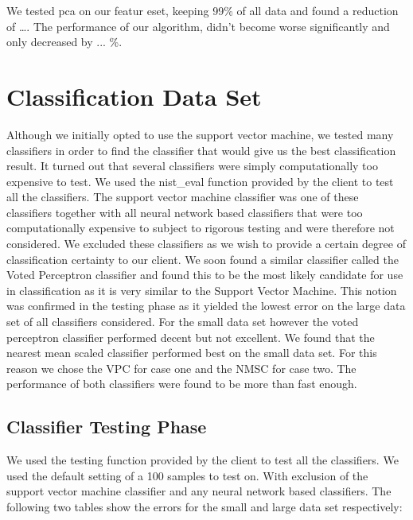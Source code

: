 \documentclass[%
        compressed,
        final,
        notitlepage,
        narroweqnarray,
        inline,
        twoside,
        ]{ieee}
\begin{document}
We tested pca on our featur eset, keeping 99\% of all data and found a reduction
of …. The performance of our algorithm, didn't become worse significantly and
only decreased by ... \%.

\section{Classification Data Set}
Although we initially opted to use the support vector machine, we tested many
classifiers in order to find the classifier that would give us the best
classification result. It turned out that several classifiers were simply
computationally too expensive to test. We used the nist\_eval function provided
by the client to test all the classifiers. The support vector machine classifier
was one of these classifiers together with all neural network based classifiers
that were too computationally expensive to subject to rigorous testing and were
therefore not considered. We excluded these classifiers as we wish to provide a
certain degree of classification certainty to our client. We soon found a
similar classifier called the Voted Perceptron classifier and found this to be
the most likely candidate for use in classification as it is very similar to the
Support Vector Machine. This notion was confirmed in the testing phase as it
yielded the lowest error on the large data set of all classifiers considered.
For the small data set however the voted perceptron classifier performed decent
but not excellent. We found that the nearest mean scaled classifier performed
best on the small data set. For this reason we chose the VPC for case one and
the NMSC for case two. The performance of both classifiers were found to be more
than fast enough.

\subsection{Classifier Testing Phase}
We used the testing function provided by the client to test all the classifiers.
We used the default setting of a 100 samples to test on. With exclusion of the
support vector machine classifier and any neural network based classifiers. The
following two tables show the errors for the small and large data set
respectively:
\end{document}
